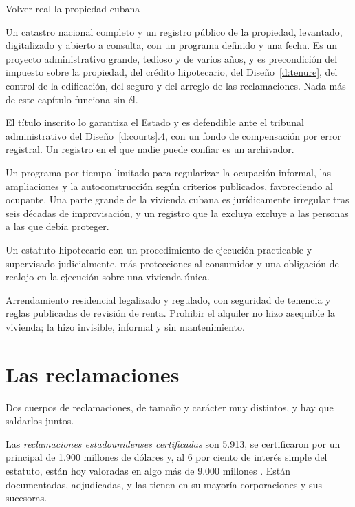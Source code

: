\begin{design}{Volver real la propiedad cubana}
\label{d:cadastre}
\begin{rules}
 Un catastro nacional completo y un registro público de la propiedad,
levantado, digitalizado y abierto a consulta, con un programa definido y una fecha. Es un
proyecto administrativo grande, tedioso y de varios años, y es precondición del impuesto sobre
la propiedad, del crédito hipotecario, del Diseño~\ref{d:tenure}, del control de la edificación,
del seguro y del arreglo de las reclamaciones. Nada más de este capítulo funciona sin él.

 El título inscrito lo garantiza el Estado y es defendible ante el
tribunal administrativo del Diseño~\ref{d:courts}.4, con un fondo de compensación por error
registral. Un registro en el que nadie puede confiar es un archivador.

 Un programa por tiempo limitado para regularizar la ocupación informal,
las ampliaciones y la autoconstrucción según criterios publicados, favoreciendo al ocupante. Una
parte grande de la vivienda cubana es jurídicamente irregular tras seis décadas de
improvisación, y un registro que la excluya excluye a las personas a las que debía proteger.

 Un estatuto hipotecario con un procedimiento de ejecución practicable y
supervisado judicialmente, más protecciones al consumidor y una obligación de realojo en la
ejecución sobre una vivienda única.

 Arrendamiento residencial legalizado y regulado, con seguridad de
tenencia y reglas publicadas de revisión de renta. Prohibir el alquiler no hizo asequible la
vivienda; la hizo invisible, informal y sin mantenimiento.
\end{rules}
\end{design}

\section{Las reclamaciones}

Dos cuerpos de reclamaciones, de tamaño y carácter muy distintos, y hay que saldarlos juntos.

Las \emph{reclamaciones estadounidenses certificadas} son 5.913, se certificaron por un
principal de 1.900 millones de dólares y, al 6 por ciento de interés simple del estatuto, están
hoy valoradas en algo más de 9.000 millones \citep{fcsc}. Están documentadas, adjudicadas, y las
tienen en su mayoría corporaciones y sus sucesoras.

